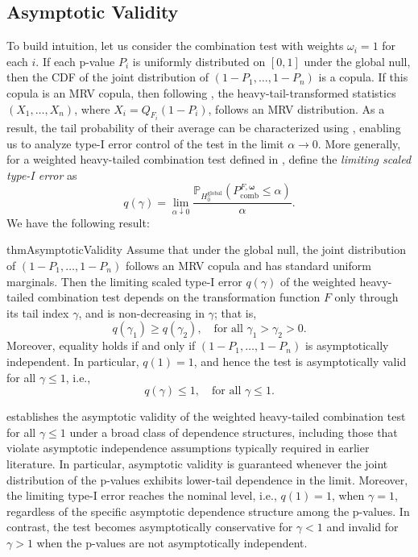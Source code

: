 \documentclass[12pt]{article}
\theoremstyle{plain}
\theoremstyle{plain}
\theoremstyle{definition}
\renewcommand{\Pr}{\mathbb{P}}
\begin{document}
\subsection{Asymptotic Validity}


To build intuition,  let us consider the combination test with weights $\omega_i = 1$ for each $i$. If each p-value $P_i$ is uniformly distributed on $[0,1]$ under the global null, then the CDF of the joint distribution of $(1-P_1, \dots, 1-P_n)$ is a copula. If this copula is an MRV copula, then following , the heavy-tail-transformed statistics $(X_1, \dots, X_n)$, where $X_i = Q_{F_{i}}(1 - P_i)$, follows an MRV distribution. 
As a result, the tail probability of their average can be characterized using , enabling us to analyze type-I error control of the test in the limit $\alpha \to 0$.
More generally, 
for a weighted heavy-tailed combination test defined in , define the \emph{limiting scaled type-I error} as
\begin{equation}
\label{eq:limiting_error}
q(\gamma)=\lim_{\alpha\downarrow0}\frac{\Pr_{H_0^\mathrm{global}}\left(P_\mathrm{comb}^{F, \bm \omega}\leq \alpha\right)}{\alpha}.
\end{equation}
We have the following result:
\begin{restatable}{thm}{AsymptoticValidity}
\label{thm:combination-test-valid}
Assume that under the global null, the joint distribution of $(1-P_1, \dots, 1-P_n)$ follows an MRV copula and has standard
uniform marginals. Then the limiting scaled type-I error \( q(\gamma) \) of the weighted heavy-tailed combination test depends on the transformation function $F$ only through its tail index $\gamma$, and is non-decreasing in $\gamma$; that is, 
\[
q(\gamma_1) \geq q(\gamma_2), \quad \text{for all } \gamma_1 > \gamma_2 > 0.
\]
Moreover, equality holds if and only if $(1 - P_1, \dots, 1 - P_n)$ is asymptotically independent. 
In particular, $q(1) =  1$, and hence the test is asymptotically valid for all $\gamma \leq 1$, i.e.,
\[
q(\gamma) \leq 1, \quad \text{for all } \gamma \leq 1.
\]
\end{restatable}

establishes the asymptotic validity of the weighted heavy-tailed combination test for all $\gamma \leq 1$ under a broad class of dependence structures, including those that violate asymptotic independence assumptions typically required in earlier literature. In particular, asymptotic validity is guaranteed whenever the joint distribution of the p-values exhibits lower-tail dependence in the limit. Moreover, the limiting type-I error reaches the nominal level, i.e., $q(1)=1$, when $\gamma = 1$, regardless of the specific asymptotic dependence structure among the p-values. In contrast, the test becomes asymptotically conservative for $\gamma < 1$ and invalid for $\gamma > 1$ when the p-values are not asymptotically independent.
\end{document}
